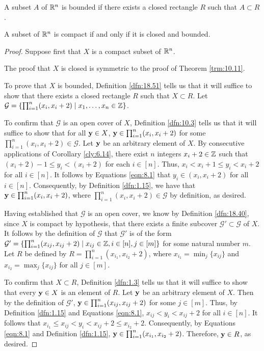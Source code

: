 \documentclass[../main.tex]{subfiles}
\begin{document}
\begin{definition}\label{dfn:18.51}
    A subset $A$ of $\mathbb{R}^n$ is bounded if there exists a closed rectangle $R$ such that $A\subset R$.
\end{definition}

\begin{theorem}\label{trm:18.52}
    A subset of $\mathbb{R}^n$ is compact if and only if it is closed and bounded.
    \begin{proof}
        Suppose first that $X$ is a compact subset of $\mathbb{R}^n$.\par\smallskip
        The proof that $X$ is closed is symmetric to the proof of Theorem \ref{trm:10.11}.\par\smallskip
        To prove that $X$ is bounded, Definition \ref{dfn:18.51} tells us that it will suffice to show that there exists a closed rectangle $R$ such that $X\subset R$. Let $\mathcal{G}=\{\prod_{i=1}^n(x_i,x_i+2)\mid x_1,\dots,x_n\in\mathbb{Z}\}$.\par
        To confirm that $\mathcal{G}$ is an open cover of $X$, Definition \ref{dfn:10.3} tells us that it will suffice to show that for all $\mathbf{y}\in X$, $\mathbf{y}\in\prod_{i=1}^n(x_i,x_i+2)$ for some $\prod_{i=1}^n(x_i,x_i+2)\in\mathcal{G}$. Let $\mathbf{y}$ be an arbitrary element of $X$. By consecutive applications of Corollary \ref{cly:6.14}, there exist $n$ integers $x_i+2\in\mathbb{Z}$ such that $(x_i+2)-1\leq y_i<(x_i+2)$ for each $i\in[n]$. Thus, $x_i<x_i+1\leq y_i<x_i+2$ for all $i\in[n]$. It follows by Equations \ref{eqn:8.1} that $y_i\in(x_i,x_i+2)$ for all $i\in[n]$. Consequently, by Definition \ref{dfn:1.15}, we have that $\mathbf{y}\in\prod_{i=1}^n(x_i,x_i+2)$, where $\prod_{i=1}^n(x_i,x_i+2)\in\mathcal{G}$ by definition, as desired.\par
        Having established that $\mathcal{G}$ is an open cover, we know by Definition \ref{dfn:18.40}, since $X$ is compact by hypothesis, that there exists a finite subcover $\mathcal{G}'\subset\mathcal{G}$ of $X$. It follows by the definition of $\mathcal{G}$ that $\mathcal{G}'$ is of the form $\mathcal{G}'=\{\prod_{i=1}^n(x_{ij},x_{ij}+2)\mid x_{ij}\in\mathbb{Z},i\in[n],j\in[m]\}$ for some natural number $m$. Let $R$ be defined by $R=\prod_{i=1}^n(x_{i_1},x_{i_2}+2)$, where $x_{i_1}=\min_j\{x_{ij}\}$ and $x_{i_2}=\max_j\{x_{ij}\}$ for all $j\in[m]$.\par
        To confirm that $X\subset R$, Definition \ref{dfn:1.3} tells us that it will suffice to show that every $\mathbf{y}\in X$ is an element of $R$. Let $\mathbf{y}$ be an arbitrary element of $X$. Then by the definition of $\mathcal{G}'$, $\mathbf{y}\in\prod_{i=1}^n(x_{ij},x_{ij}+2)$ for some $j\in[m]$. Thus, by Definition \ref{dfn:1.15} and Equations \ref{eqn:8.1}, $x_{ij}<y_i<x_{ij}+2$ for all $i\in[n]$. It follows that $x_{i_1}\leq x_{ij}<y_i<x_{ij}+2\leq x_{i_2}+2$. Consequently, by Equations \ref{eqn:8.1} and Definition \ref{dfn:1.15}, $\mathbf{y}\in\prod_{i=1}^n(x_{i_1},x_{i_2}+2)$. Therefore, $\mathbf{y}\in R$, as desired.\par\medskip

\end{proof}
\end{theorem}
\end{document}
